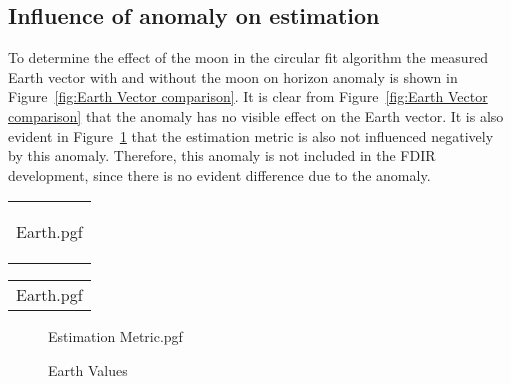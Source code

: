 \subsection{Influence of anomaly on estimation}
To determine the effect of the moon in the circular fit algorithm the measured Earth vector with and without the moon on horizon anomaly is shown in Figure~\ref{fig:Earth Vector comparison}. It is clear from Figure~\ref{fig:Earth Vector comparison} that the anomaly has no visible effect on the Earth vector. It is also evident in Figure~\ref{fig:Moon On Horizon Estimation Metric} that the estimation metric is also not influenced negatively by this anomaly. Therefore, this anomaly is not included in the FDIR development, since there is no evident difference due to the anomaly.
\begin{figure*}[!htb]
	\begin{tabular}{@{}c@{}}
	\centering

	{Earth.pgf}
	
	\label{fig:Earth Vector comparison with moon on the horizon}
	\end{tabular}
	\begin{tabular}{@{}c@{}}
		\centering
		{Earth.pgf} 
		\label{fig:Sun Vector comparison without moon on the horizon}
	\end{tabular}
	
	\caption{Comparison of Earth Vector with and without moon on the horizon}
	\label{fig:Earth Vector comparison}
	
\end{figure*}

\begin{figure}[!htb]
	\centering
	
	{Estimation Metric.pgf}
	
	\caption{Earth Values}
	\label{fig:Moon On Horizon Estimation Metric}
\end{figure}


